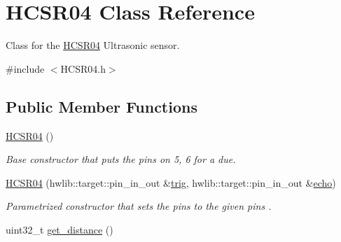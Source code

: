 \hypertarget{classHCSR04}{}\section{H\+C\+S\+R04 Class Reference}
\label{classHCSR04}


Class for the \hyperlink{classHCSR04}{H\+C\+S\+R04} Ultrasonic sensor.  




{\ttfamily \#include $<$H\+C\+S\+R04.\+h$>$}

\subsection*{Public Member Functions}
\begin{DoxyCompactItemize}
\item 
\hyperlink{classHCSR04_a84d6bba2b28d9a617e0dba76626393f7}{H\+C\+S\+R04} ()\hypertarget{classHCSR04_a84d6bba2b28d9a617e0dba76626393f7}{}\label{classHCSR04_a84d6bba2b28d9a617e0dba76626393f7}

\begin{DoxyCompactList}\small\item\em Base constructor that puts the pins on 5, 6 for a due. \end{DoxyCompactList}\item 
\hyperlink{classHCSR04_a32e3386f624763b956a0193c5581da33}{H\+C\+S\+R04} (hwlib\+::target\+::pin\+\_\+in\+\_\+out \&\hyperlink{classHCSR04_a933785dd5cb0ffba2517301d6227b6da}{trig}, hwlib\+::target\+::pin\+\_\+in\+\_\+out \&\hyperlink{classHCSR04_a4bff7a40fb1ed489b83d60258444c9fb}{echo})
\begin{DoxyCompactList}\small\item\em Parametrized constructor that sets the pins to the given pins . \end{DoxyCompactList}\item 
uint32\+\_\+t \hyperlink{classHCSR04_a6f0e9830e49a9f482211890ca87e98c4}{get\+\_\+distance} ()
\end{DoxyCompactItemize}
